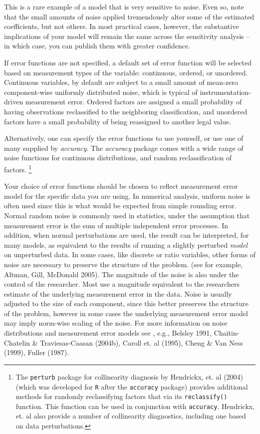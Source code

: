\documentclass[11pt]{article}
\begin{document}
This is a rare example of a model that is very sensitive to noise.
Even so, note that the small amounts of  noise applied 
tremendously alter some of the estimated coefficients, but not others.  In most 
practical cases, however,  the substantive implications of your model will remain the same
across the sensitivity analysis -- in which case, you can publish them with
greater confidence. 

If error functions are not specified, a default  set of error function will be 
selected based on measurement types of the variable: continuous, ordered, or unordered.
Continuous variables, by default are subject to a small amount of
 mean-zero component-wise uniformly distributed
noise, which is typical of instrumentation-driven measurement error. Ordered factors
are assigned a small probability of having observations reclassified to the neighboring classification,
and unordered factors have a small probability of being reassigned to another legal value.

Alternatively, one can specify the error functions to use yourself, or use one of many
supplied by \emph{accuracy}.  The \emph{accuracy} package comes with a wide range 
of noise functions for continuous distributions,  and random reclassification of factors. 
\footnote{The \texttt{perturb} package for collinearity diagnosis by Hendrickx, et. al (2004) (which was
developed for \texttt{R} after the \texttt{accuracy} package) provides additional
methods for randomly reclassifying factors that via its \texttt{reclassify()} function. 
This function can be used in conjunction with \texttt{accuracy}. 
Hendrickx, et. al also provide a number of collinearity 
diagnostics, including one based on data perturbations. } 

Your choice of error functions should be chosen to reflect measurement error model for the specific
data you are using. In numerical analysis,  uniform noise  is often used since this is what would be
expected from  simple rounding error.  Normal random noise is commonly used in statistics,
under the assumption that measurement error is the sum of multiple independent error processes. In 
addition, when normal perturbations are used, the result can be interpreted, for many models, as equivalent
to the results of running a slightly perturbed \emph{model} on unperturbed data.  In some cases,
like discrete or ratio variables, other forms of noise are necessary to preserve
the structure of the problem. (see for example, Altman, Gill, McDonald 2005). 
The magnitude of the noise is also under the control of the researcher. Most
use a magnitude equivalent to the researchers estimate of the underlying measurement error in the data.
Noise is usually adjusted to the size of each component, since this better
preserves the structure of the problem, however in some cases the underlying
measurement error model may imply norm-wise scaling of the noise. For more
information on noise distributions and measurement error models see , e.g., 
Belsley 1991, Chaitin-Chatelin \& Traviesas-Caasan  (2004b), Caroll et. al (1995), Cheng \& Van Ness (1999), Fuller (1987).
\end{document}
